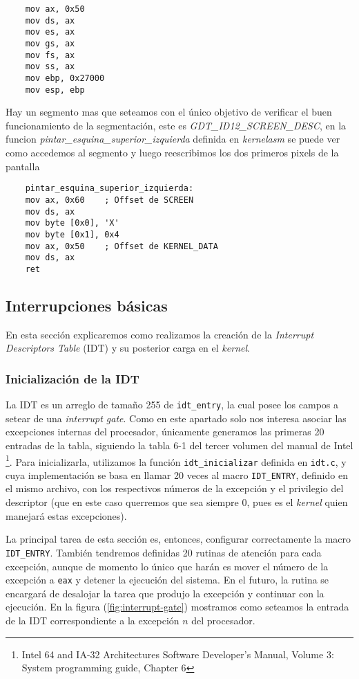 \begin{lstlisting}
	mov ax, 0x50	
	mov ds, ax
	mov es, ax
	mov gs, ax
	mov fs, ax
	mov ss, ax
	mov ebp, 0x27000
	mov esp, ebp
\end{lstlisting}

Hay un segmento mas que seteamos con el único objetivo de verificar el buen funcionamiento de la segmentación, este es \textit{GDT\_ID12\_SCREEN\_DESC}, en la funcion \textit{pintar\_esquina\_superior\_izquierda} definida en \textit{kernelasm} se puede ver como accedemos al segmento y luego reescribimos los dos primeros pixels de la pantalla

\begin{lstlisting}
	pintar_esquina_superior_izquierda:
	mov ax, 0x60	; Offset de SCREEN
	mov ds, ax
	mov byte [0x0], 'X'
	mov byte [0x1], 0x4
	mov ax, 0x50	; Offset de KERNEL_DATA
	mov ds, ax
	ret	
\end{lstlisting}

\subsection{Interrupciones básicas}
En esta sección explicaremos como realizamos la creación de la \textit{Interrupt Descriptors Table} (IDT) y su posterior carga en el \textit{kernel}.

\subsubsection{Inicialización de la IDT}
La IDT es un arreglo de tamaño 255 de \texttt{idt\_entry}, la cual posee los campos a setear de una \textit{interrupt gate}. Como en este apartado solo nos interesa asociar las excepciones internas del procesador, únicamente generamos las primeras 20 entradas de la tabla, siguiendo la tabla 6-1 del tercer volumen del manual de Intel \footnote{Intel 64 and IA-32 Architectures Software Developer's Manual, Volume 3: System programming guide, Chapter 6}. Para inicializarla, utilizamos la función \texttt{idt\_inicializar} definida en \texttt{idt.c}, y cuya implementación se basa en llamar 20 veces al macro \texttt{IDT\_ENTRY}, definido en el mismo archivo, con los respectivos números de la excepción y el privilegio del descriptor (que en este caso querremos que sea siempre 0, pues es el \textit{kernel} quien manejará estas excepciones).

La principal tarea de esta sección es, entonces, configurar correctamente la macro \texttt{IDT\_ENTRY}. También tendremos definidas 20 rutinas de atención para cada excepción, aunque de momento lo único que harán es mover el número de la excepción a \texttt{eax} y detener la ejecución del sistema. En el futuro, la rutina se encargará de desalojar la tarea que produjo la excepción y continuar con la ejecución.
En la figura (\ref{fig:interrupt-gate}) mostramos como seteamos la entrada de la IDT correspondiente a la excepción $n$ del procesador.
\vspace{1em}

